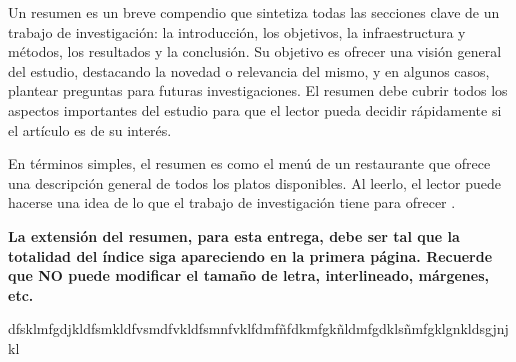 Un resumen es un breve compendio que sintetiza todas las secciones clave de un trabajo de investigación: la introducción, los objetivos, la infraestructura y métodos, los resultados y la conclusión. Su objetivo es ofrecer una visión general del estudio, destacando la novedad o relevancia del mismo, y en algunos casos, plantear preguntas para futuras investigaciones. El resumen debe cubrir todos los aspectos importantes del estudio para que el lector pueda decidir rápidamente si el artículo es de su interés.

En términos simples, el resumen es como el menú de un restaurante que ofrece una descripción general de todos los platos disponibles. Al leerlo, el lector puede hacerse una idea de lo que el trabajo de investigación tiene para ofrecer \cite{elsevier_abstract_2024}.

\textbf{La extensión del resumen, para esta entrega, debe ser tal que la totalidad del índice siga apareciendo en la primera página. Recuerde que NO puede modificar el tamaño de letra, interlineado, márgenes, etc.}

dfsklmfgdjkldfsmkldfvsmdfvkldfsmnfvklfdmfñfdkmfgkñldmfgdklsñmfgklgnkldsgjnjkl